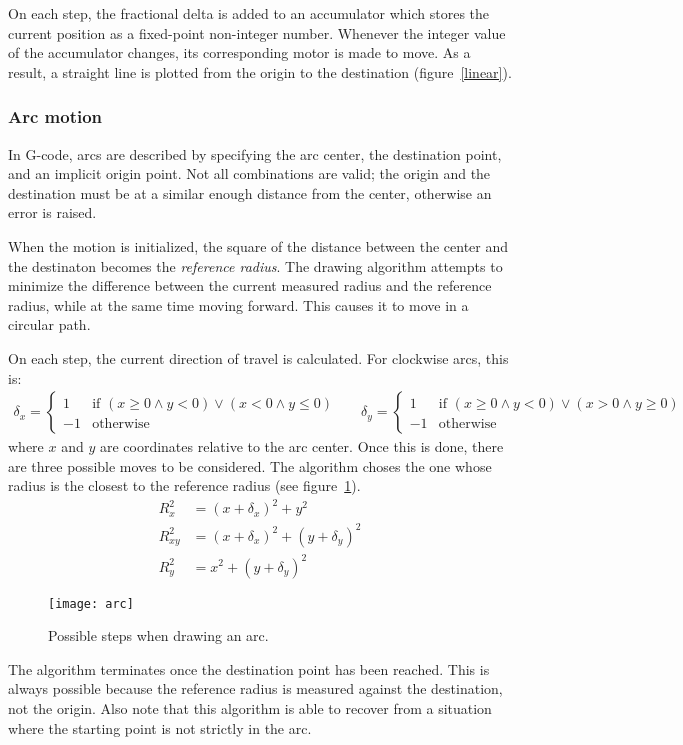 On each step, the fractional delta is added to an accumulator which stores the
current position as a fixed-point non-integer number. Whenever the integer value
of the accumulator changes, its corresponding motor is made to move. As a
result, a straight line is plotted from the origin to the destination
(figure~\ref{linear}).

\subsubsection{Arc motion}

In G-code, arcs are described by specifying the arc center, the destination
point, and an implicit origin point. Not all combinations are valid; the origin
and the destination must be at a similar enough distance from the center,
otherwise an error is raised.

When the motion is initialized, the square of the distance between the center
and the destinaton becomes the \textit{reference radius}. The drawing algorithm
attempts to minimize the difference between the current measured radius and the
reference radius, while at the same time moving forward. This causes it to move
in a circular path.

On each step, the current direction of travel is calculated. For clockwise arcs,
this is:
\begin{align*}
    \delta_x = \begin{cases}
        1 & \text{if } (x \geq 0 \land y < 0) \lor (x < 0 \land y \leq 0)\\
        -1 & \text{otherwise}
    \end{cases}
    &&
    \delta_y = \begin{cases}
        1 & \text{if } (x \geq 0 \land y < 0) \lor (x > 0 \land y \geq 0)\\
        -1 & \text{otherwise}
    \end{cases}
\end{align*}
where $x$ and $y$ are coordinates relative to the arc center. Once this is done,
there are three possible moves to be considered. The algorithm choses the one
whose radius is the closest to the reference radius (see figure~\ref{arc}).
\begin{align*}
    R^2_x &= (x + \delta_x)^2 + y^2 \\
    R^2_{xy} &= (x + \delta_x)^2 + (y + \delta_y)^2 \\
    R^2_y &= x^2 + (y + \delta_y)^2
\end{align*}

\begin{figure}[ht]
    \begin{center}
        \texttt{[image: arc]}
        \caption{Possible steps when drawing an arc.}
        \label{arc}
    \end{center}
\end{figure}

The algorithm terminates once the destination point has been reached. This is
always possible because the reference radius is measured against the
destination, not the origin. Also note that this algorithm is able to recover
from a situation where the starting point is not strictly in the arc.
